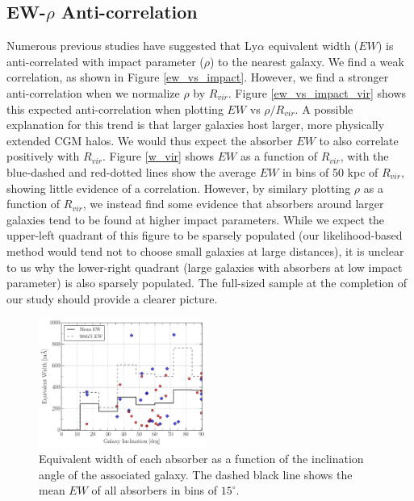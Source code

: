 \documentclass[twocolumn,tighten]{aastex6}
\begin{document}
\subsection{EW-$\rho$ Anti-correlation}
Numerous previous studies have suggested that Ly$\alpha$ equivalent width ($EW$) is anti-correlated with impact parameter ($\rho$) to the nearest galaxy. We find a weak correlation, as shown in Figure \ref{ew_vs_impact}. However, we find a stronger anti-correlation when we normalize $\rho$ by $R_{vir}$. Figure \ref{ew_vs_impact_vir} shows this expected anti-correlation when plotting $EW$ vs $\rho/R_{vir}$. A possible explanation for this trend is that larger galaxies host larger, more physically extended CGM halos. We would thus expect the absorber $EW$ to also correlate positively with $R_{vir}$. Figure \ref{w_vir} shows $EW$ as a function of $R_{vir}$, with the blue-dashed and red-dotted lines show the average $EW$ in bins of 50 kpc of $R_{vir}$, showing little evidence of a correlation. However, by similary plotting $\rho$ as a function of $R_{vir}$, we instead find some evidence that absorbers around larger galaxies tend to be found at higher impact parameters. While we expect the upper-left quadrant of this figure to be sparsely populated (our likelihood-based method would tend not to choose small galaxies at large distances), it is unclear to us why the lower-right quadrant (large galaxies with absorbers at low impact parameter) is also sparsely populated. The full-sized sample at the completion of our study should provide a clearer picture.


\begin{figure}[h!]
        \centering
        \includegraphics[width=0.49\textwidth]{W(fancy_inc)_mean_90_hist2.pdf}
        \caption{\small{Equivalent width of each absorber as a function of the inclination angle of the associated galaxy. The dashed black line shows the mean $EW$ of all absorbers in bins of $15^{\circ}$.}}
        \label{ew_vs_inclination}
        \vspace{2pt}
\end{figure}
\end{document}
